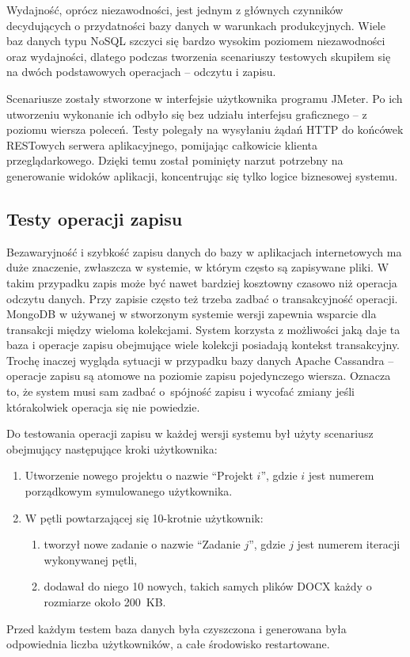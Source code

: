 Wydajność, oprócz niezawodności, jest jednym z głównych czynników decydujących o przydatności bazy danych w warunkach produkcyjnych. 
Wiele baz danych typu NoSQL szczyci się bardzo wysokim poziomem niezawodności oraz wydajności, dlatego podczas tworzenia scenariuszy testowych skupiłem się na dwóch podstawowych operacjach -- odczytu i zapisu.

Scenariusze zostały stworzone w interfejsie użytkownika programu JMeter.
Po ich utworzeniu wykonanie ich odbyło się bez udziału interfejsu graficznego -- z poziomu wiersza poleceń.
Testy polegały na wysyłaniu żądań HTTP do końcówek RESTowych serwera aplikacyjnego, pomijając całkowicie klienta przeglądarkowego.
Dzięki temu został pominięty narzut potrzebny na generowanie widoków aplikacji, koncentrując się tylko logice biznesowej systemu.

\subsection{Testy operacji zapisu} \label{sec:zapisScenariusz}

Bezawaryjność i szybkość zapisu danych do bazy w aplikacjach internetowych ma duże znaczenie, zwłaszcza w systemie, w którym często są zapisywane pliki.
W takim przypadku zapis może być nawet bardziej kosztowny czasowo niż operacja odczytu danych.
Przy zapisie często też trzeba zadbać o transakcyjność operacji.
MongoDB w używanej w stworzonym systemie wersji zapewnia wsparcie dla transakcji między wieloma kolekcjami.
System korzysta z możliwości jaką daje ta baza i operacje zapisu obejmujące wiele kolekcji posiadają kontekst transakcyjny.
Trochę inaczej wygląda sytuacji w przypadku bazy danych Apache Cassandra -- operacje zapisu są atomowe na poziomie zapisu pojedynczego wiersza.
Oznacza to, że system musi sam zadbać o~spójność zapisu i wycofać zmiany jeśli którakolwiek operacja się nie powiedzie.

Do testowania operacji zapisu w każdej wersji systemu był użyty scenariusz obejmujący następujące kroki użytkownika:
\begin{enumerate}
    \item Utworzenie nowego projektu o nazwie \enquote{Projekt $i$}, gdzie $i$ jest numerem porządkowym symulowanego użytkownika.
    \item W pętli powtarzającej się 10-krotnie użytkownik:
    \begin{enumerate}
        \item tworzył nowe zadanie o nazwie \enquote{Zadanie $j$}, gdzie $j$ jest numerem iteracji wykonywanej pętli,
        \item dodawał do niego 10 nowych, takich samych plików DOCX każdy o rozmiarze około 200~KB.
    \end{enumerate}
\end{enumerate}
Przed każdym testem baza danych była czyszczona i generowana była odpowiednia liczba użytkowników, a całe środowisko restartowane.

